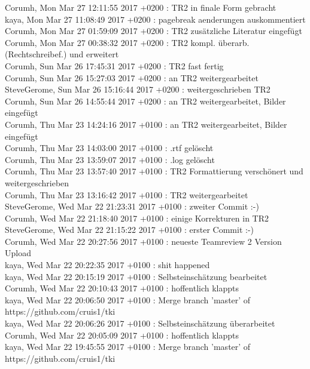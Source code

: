 Corumh, Mon Mar 27 12:11:55 2017 +0200 : TR2 in finale Form gebracht\\
kaya, Mon Mar 27 11:08:49 2017 +0200 : pagebreak aenderungen auskommentiert\\
Corumh, Mon Mar 27 01:59:09 2017 +0200 : TR2 zusätzliche Literatur eingefügt\\
Corumh, Mon Mar 27 00:38:32 2017 +0200 : TR2 kompl. überarb. (Rechtschreibef.) und erweitert\\
Corumh, Sun Mar 26 17:45:31 2017 +0200 : TR2 fast fertig\\
Corumh, Sun Mar 26 15:27:03 2017 +0200 : an TR2 weitergearbeitet\\
SteveGerome, Sun Mar 26 15:16:44 2017 +0200 : weitergeschrieben TR2\\
Corumh, Sun Mar 26 14:55:44 2017 +0200 : an TR2 weitergearbeitet, Bilder eingefügt\\
Corumh, Thu Mar 23 14:24:16 2017 +0100 : an TR2 weitergearbeitet, Bilder eingefügt\\
Corumh, Thu Mar 23 14:03:00 2017 +0100 : .rtf gelöscht\\
Corumh, Thu Mar 23 13:59:07 2017 +0100 : .log gelöscht\\
Corumh, Thu Mar 23 13:57:40 2017 +0100 : TR2 Formattierung verschönert und weitergeschrieben\\
Corumh, Thu Mar 23 13:16:42 2017 +0100 : TR2 weitergearbeitet\\
SteveGerome, Wed Mar 22 21:23:31 2017 +0100 : zweiter Commit :-)\\
Corumh, Wed Mar 22 21:18:40 2017 +0100 : einige Korrekturen in TR2\\
SteveGerome, Wed Mar 22 21:15:22 2017 +0100 : erster Commit :-)\\
Corumh, Wed Mar 22 20:27:56 2017 +0100 : neueste Teamreview 2 Version Upload\\
kaya, Wed Mar 22 20:22:35 2017 +0100 : shit happened\\
kaya, Wed Mar 22 20:15:19 2017 +0100 : Selbsteinschätzung bearbeitet\\
Corumh, Wed Mar 22 20:10:43 2017 +0100 : hoffentlich klappts\\
kaya, Wed Mar 22 20:06:50 2017 +0100 : Merge branch 'master' of https://github.com/cruis1/tki\\
kaya, Wed Mar 22 20:06:26 2017 +0100 : Selbsteinschätzung überarbeitet\\
Corumh, Wed Mar 22 20:05:09 2017 +0100 : hoffentlich klappts\\
kaya, Wed Mar 22 19:45:55 2017 +0100 : Merge branch 'master' of https://github.com/cruis1/tki\\
